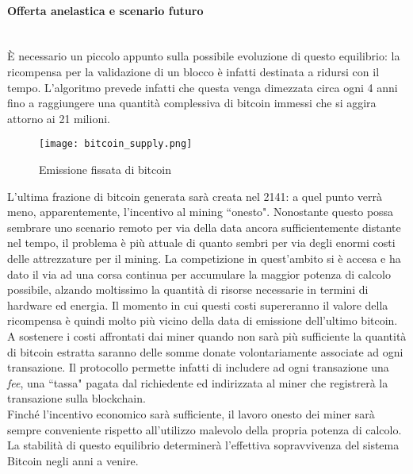 			\paragraph{Offerta anelastica e scenario futuro} ~ \\
				È necessario un piccolo appunto sulla possibile evoluzione di questo equilibrio: la ricompensa per la validazione di un blocco è infatti destinata a ridursi con il tempo. L'algoritmo prevede infatti che questa venga dimezzata circa ogni 4 anni fino a raggiungere una quantità complessiva di bitcoin immessi che si aggira attorno ai 21 milioni.
				\begin{figure}[ht]
					\centering
					\texttt{[image: bitcoin\_supply.png]}
					\caption{Emissione fissata di bitcoin}
					\label{fig:bitcoin_supply}
				\end{figure}
				L'ultima frazione di bitcoin generata sarà creata nel 2141: a quel punto verrà meno, apparentemente, l'incentivo al mining ``onesto". Nonostante questo possa sembrare uno scenario remoto per via della data ancora sufficientemente distante nel tempo, il problema è più attuale di quanto sembri per via degli enormi costi delle attrezzature per il mining. La competizione in quest'ambito si è accesa e ha dato il via ad una corsa continua per accumulare la maggior potenza di calcolo possibile, alzando moltissimo la quantità di risorse necessarie in termini di hardware ed energia. Il momento in cui questi costi supereranno il valore della ricompensa è quindi molto più vicino della data di emissione dell'ultimo bitcoin. \\
				A sostenere i costi affrontati dai miner quando non sarà più sufficiente la quantità di bitcoin estratta saranno delle somme donate volontariamente associate ad ogni transazione. Il protocollo permette infatti di includere ad ogni transazione una \emph{fee}, una ``tassa" pagata dal richiedente ed indirizzata al miner che registrerà la transazione sulla blockchain. \\
				Finché l'incentivo economico sarà sufficiente, il lavoro onesto dei miner sarà sempre conveniente rispetto all'utilizzo malevolo della propria potenza di calcolo. La stabilità di questo equilibrio determinerà l'effettiva sopravvivenza del sistema Bitcoin negli anni a venire.